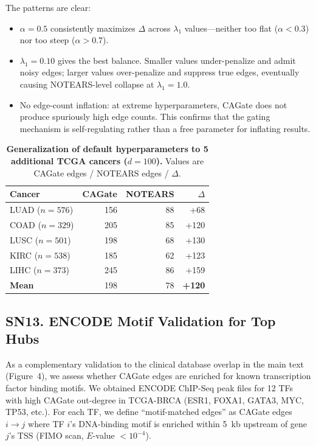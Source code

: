\documentclass[11pt,a4paper]{article}
\begin{document}
The patterns are clear:
\begin{itemize}[leftmargin=*,itemsep=2pt]
    \item $\alpha = 0.5$ consistently maximizes $\Delta$ across $\lambda_1$ values---neither too flat ($\alpha < 0.3$) nor too steep ($\alpha > 0.7$).
    \item $\lambda_1 = 0.10$ gives the best balance. Smaller values under-penalize and admit noisy edges; larger values over-penalize and suppress true edges, eventually causing NOTEARS-level collapse at $\lambda_1 = 1.0$.
    \item No edge-count inflation: at extreme hyperparameters, CAGate does not produce spuriously high edge counts. This confirms that the gating mechanism is self-regulating rather than a free parameter for inflating results.
\end{itemize}

\begin{table}[htbp]
\centering
\caption{\textbf{Generalization of default hyperparameters to 5 additional TCGA cancers ($d=100$).} Values are CAGate edges / NOTEARS edges / $\Delta$.}
\label{tab:s8}
\small
\begin{tabular}{lrrr}
\toprule
Cancer & CAGate & NOTEARS & $\Delta$ \\
\midrule
LUAD ($n=576$) & 156 & 88 & +68 \\
COAD ($n=329$) & 205 & 85 & +120 \\
LUSC ($n=501$) & 198 & 68 & +130 \\
KIRC ($n=538$) & 185 & 62 & +123 \\
LIHC ($n=373$) & 245 & 86 & +159 \\
\midrule
\textbf{Mean} & 198 & 78 & \textbf{+120} \\
\bottomrule
\end{tabular}
\end{table}

\subsection*{SN13. ENCODE Motif Validation for Top Hubs}

As a complementary validation to the clinical database overlap in the main text (Figure~4), we assess whether CAGate edges are enriched for known transcription factor binding motifs. We obtained ENCODE ChIP-Seq peak files for 12 TFs with high CAGate out-degree in TCGA-BRCA (ESR1, FOXA1, GATA3, MYC, TP53, etc.). For each TF, we define ``motif-matched edges'' as CAGate edges $i \to j$ where TF $i$'s DNA-binding motif is enriched within 5~kb upstream of gene $j$'s TSS (FIMO scan, $E$-value $< 10^{-4}$).
\end{document}
